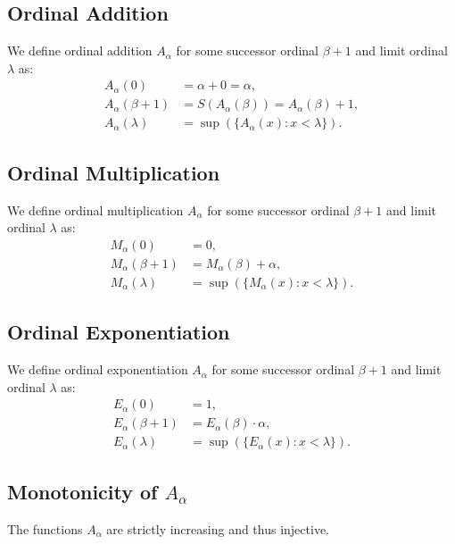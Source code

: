 \subsection{Ordinal Addition}

We define ordinal addition $A_\alpha$ for some successor ordinal
$\beta + 1$ and limit ordinal $\lambda$ as: \begin{align*}
    A_\alpha(0) &= \alpha + 0 = \alpha, \\
    A_\alpha(\beta + 1) &= S(A_\alpha(\beta)) = A_\alpha(\beta) + 1, \\
    A_\alpha(\lambda) &= \sup(\{A_\alpha(x) : x < \lambda\}).
\end{align*}

\subsection{Ordinal Multiplication}

We define ordinal multiplication $A_\alpha$ for some successor ordinal
$\beta + 1$ and limit ordinal $\lambda$ as: \begin{align*}
    M_\alpha(0) &= 0, \\
    M_\alpha(\beta + 1) &= M_\alpha(\beta) + \alpha, \\
    M_\alpha(\lambda) &= \sup(\{M_\alpha(x) : x < \lambda\}).
\end{align*}

\subsection{Ordinal Exponentiation}

We define ordinal exponentiation $A_\alpha$ for some successor ordinal
$\beta + 1$ and limit ordinal $\lambda$ as: \begin{align*}
    E_\alpha(0) &= 1, \\
    E_\alpha(\beta + 1) &= E_\alpha(\beta) \cdot \alpha, \\
    E_\alpha(\lambda) &= \sup(\{E_\alpha(x) : x < \lambda\}).
\end{align*}

\subsection{Monotonicity of $A_\alpha$}

The functions $A_\alpha$ are strictly increasing and thus injective.

